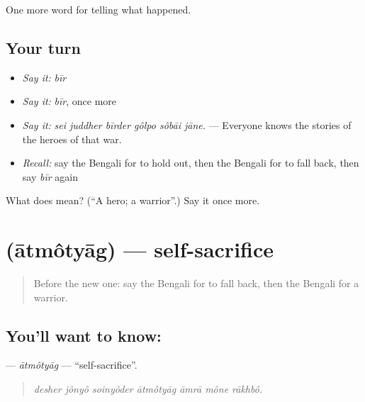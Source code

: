 \begin{grammarlens}[title={What you've built}]
One more word for telling what happened.
\end{grammarlens}

\subsection*{Your turn}
\begin{itemize}
\raggedright
  \item \emph{Say it:} \emph{bīr}
  \item \emph{Say it:} \emph{bīr}, once more
  \item \emph{Say it:} \emph{sei juddher bīrder gôlpo sôbāi jāne.} — Everyone knows the stories of the heroes of that war.
  \item \emph{Recall:} say the Bengali for to hold out, then the Bengali for to fall back, then say \emph{bīr} again
\end{itemize}

\begin{tcolorbox}[breakable,colback=teal!4,colframe=teal!35!black,title={Before you move on}]
What does  mean? (\textquotedblleft{}A hero; a warrior\textquotedblright{}.) Say it once more.
\end{tcolorbox}
\section[\texorpdfstring{\bn{আত্মত্যাগ} (ātmôtyāg)}{আত্মত্যাগ (ātmôtyāg)}]{ (ātmôtyāg) — self-sacrifice}

\label{lesson:BN-C317-atmotyag}



\begin{quote}
Before the new one: say the Bengali for to fall back, then the Bengali for a warrior.
\end{quote}

\subsection*{You'll want to know: }
\textbf{} — \emph{ātmôtyāg} — \textquotedblleft{}self-sacrifice\textquotedblright{}.

\begin{quote}
      
\end{quote}

\begin{quote}
\emph{desher jônyô soinyôder ātmôtyāg āmrā mône rākhbô.}
\end{quote}

